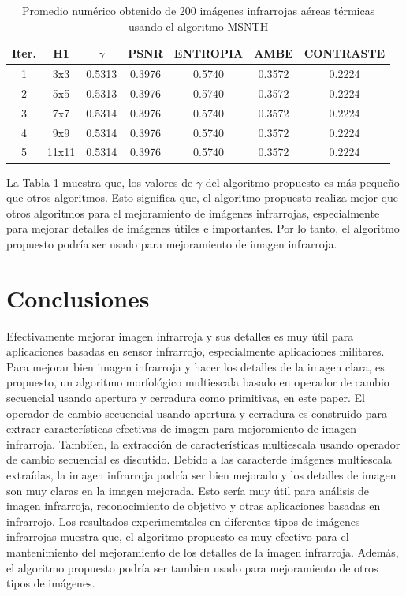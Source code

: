 \documentclass[a4paper, 11 pt, conference]{ieeeconf}      %
\begin{document}
\begin{table}[h]
\centering
\tiny
\caption{Promedio num\'erico obtenido de 200 im\'agenes infrarrojas a\'ereas t\'ermicas usando el algoritmo MSNTH}
\label{tabla_5}
\begin{center}
\begin{tabular}{ c c c c c c c }
\hline
\textbf{Iter.} & \textbf{H1} & \textbf{$\gamma$} & \textbf{PSNR} & \textbf{ENTROPIA} & \textbf{AMBE} & \textbf{CONTRASTE} \\
\hline
1 & 3x3 & 0.5313 & 0.3976 & 0.5740 & 0.3572 & 0.2224 \\
2 & 5x5 & 0.5313 & 0.3976 & 0.5740 & 0.3572 & 0.2224 \\
3 & 7x7 & 0.5314 & 0.3976 & 0.5740 & 0.3572 & 0.2224 \\
4 & 9x9 & 0.5314 & 0.3976 & 0.5740 & 0.3572 & 0.2224 \\
5 & 11x11 & 0.5314 & 0.3976 & 0.5740 & 0.3572 & 0.2224 \\
\hline
\end{tabular}
\end{center}
\end{table}
\normalsize

La Tabla 1 muestra que, los valores de $\gamma$ del algoritmo propuesto es m\'as pequeño que otros algoritmos. Esto significa que, el algoritmo propuesto realiza mejor que otros algoritmos para el mejoramiento de im\'agenes infrarrojas, especialmente para mejorar detalles de im\'agenes \'utiles e importantes. Por lo tanto, el algoritmo propuesto podr\'ia ser usado para mejoramiento de imagen infrarroja.

\section{Conclusiones}

Efectivamente mejorar imagen infrarroja y sus detalles es muy \'util para aplicaciones basadas en sensor infrarrojo, especialmente aplicaciones militares. Para mejorar bien imagen infrarroja y hacer los detalles de la imagen clara, es propuesto, un algoritmo morfol\'ogico multiescala basado en operador de cambio secuencial usando apertura y cerradura como primitivas, en este paper. El operador de cambio secuencial usando apertura y cerradura es construido para extraer caracter\'isticas efectivas de imagen para mejoramiento de imagen infrarroja. Tambi\'ien, la extracci\'on de caracter\'isticas multiescala usando operador de cambio secuencial es discutido. Debido a las caracter\isticas de im\'agenes multiescala extra\'idas, la imagen infrarroja podr\'ia ser bien mejorado y los detalles de imagen son muy claras en la imagen mejorada. Esto ser\'ia muy \'util para an\'alisis de imagen infrarroja, reconocimiento de objetivo y otras aplicaciones basadas en infrarrojo. Los resultados experimemtales en diferentes tipos de im\'agenes infrarrojas muestra que, el algoritmo propuesto es muy efectivo para el mantenimiento del mejoramiento de los detalles de la imagen infrarroja. Adem\'as, el algoritmo propuesto podr\'ia ser tambien usado para mejoramiento de otros tipos de im\'agenes.
\end{document}
